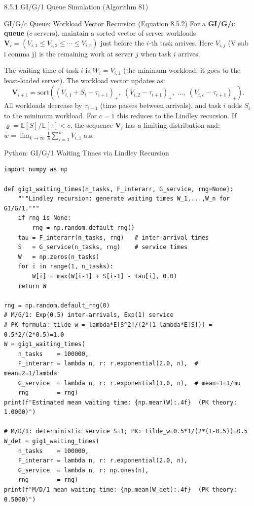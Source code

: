 \documentclass[aspectratio=169,10pt]{beamer}
\newcommand{\E}{\mathbb{E}}
\begin{document}
\begin{frame}[allowframebreaks]{8.5.1 GI/G/1 Queue Simulation (Algorithm 81)}
\begin{block}{GI/G/c Queue: Workload Vector Recursion (Equation 8.5.2)}
For a \textbf{GI/G/c queue} ($c$ servers), maintain a sorted vector of server
workloads $\mathbf{V}_i = (V_{i,1} \le V_{i,2} \le \cdots \le V_{i,c})$ just
before the $i$-th task arrives.  Here $V_{i,j}$ (V sub i comma j) is the
remaining work at server $j$ when task $i$ arrives.

The waiting time of task $i$ is $W_i = V_{i,1}$ (the minimum workload; it goes
to the least-loaded server).  The workload vector updates as:
\[
  \mathbf{V}_{i+1} = \mathrm{sort}\!\left((V_{i,1} + S_i - \tau_{i+1})_+,\;
                     (V_{i,2} - \tau_{i+1})_+,\; \ldots,\;
                     (V_{i,c} - \tau_{i+1})_+\right).
\]
All workloads decrease by $\tau_{i+1}$ (time passes between arrivals), and task
$i$ adds $S_i$ to the minimum workload.  For $c=1$ this reduces to the Lindley
recursion.  If $\varrho = \E[S]/\E[\tau] < c$, the sequence $\mathbf{V}_i$ has
a limiting distribution and:
$\tilde{w} = \lim_{k\to\infty}\frac{1}{k}\sum_{i=1}^k V_{i,1}$ a.s.
\end{block}

\end{frame}

\begin{frame}[fragile]{Python: GI/G/1 Waiting Times via Lindley Recursion}
\begin{lstlisting}[style=python]
import numpy as np

def gig1_waiting_times(n_tasks, F_interarr, G_service, rng=None):
    """Lindley recursion: generate waiting times W_1,...,W_n for GI/G/1."""
    if rng is None:
        rng = np.random.default_rng()
    tau = F_interarr(n_tasks, rng)   # inter-arrival times
    S   = G_service(n_tasks, rng)    # service times
    W   = np.zeros(n_tasks)
    for i in range(1, n_tasks):
        W[i] = max(W[i-1] + S[i-1] - tau[i], 0.0)
    return W

rng = np.random.default_rng(0)
# M/G/1: Exp(0.5) inter-arrivals, Exp(1) service
# PK formula: tilde_w = lambda*E[S^2]/(2*(1-lambda*E[S])) = 0.5*2/(2*0.5)=1.0
W = gig1_waiting_times(
    n_tasks    = 100000,
    F_interarr = lambda n, r: r.exponential(2.0, n),  # mean=2=1/lambda
    G_service  = lambda n, r: r.exponential(1.0, n),  # mean=1=1/mu
    rng        = rng)
print(f"Estimated mean waiting time: {np.mean(W):.4f}  (PK theory: 1.0000)")

# M/D/1: deterministic service S=1; PK: tilde_w=0.5*1/(2*(1-0.5))=0.5
W_det = gig1_waiting_times(
    n_tasks    = 100000,
    F_interarr = lambda n, r: r.exponential(2.0, n),
    G_service  = lambda n, r: np.ones(n),
    rng        = rng)
print(f"M/D/1 mean waiting time: {np.mean(W_det):.4f}  (PK theory: 0.5000)")
\end{lstlisting}
\end{frame}
\end{document}
